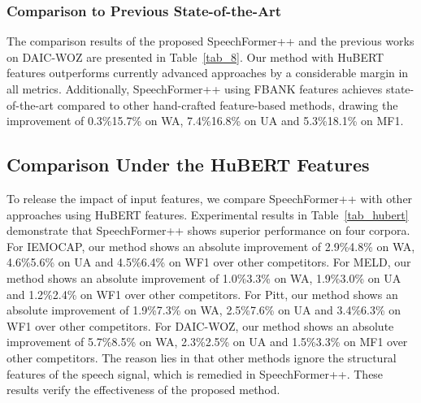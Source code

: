 \documentclass[lettersize,journal]{IEEEtran}
\begin{document}
\subsubsection{Comparison to Previous State-of-the-Art} The comparison results of the proposed SpeechFormer++ and the previous works on DAIC-WOZ are presented in Table~\ref{tab_8}. Our method with HuBERT features outperforms currently advanced approaches by a considerable margin in all metrics. Additionally, SpeechFormer++ using FBANK features achieves state-of-the-art compared to other hand-crafted feature-based methods, drawing the improvement of 0.3\%15.7\% on WA, 7.4\%16.8\% on UA and 5.3\%18.1\% on MF1.

\subsection{Comparison Under the HuBERT Features}
To release the impact of input features, we compare SpeechFormer++ with other approaches using HuBERT features. Experimental results in Table~\ref{tab_hubert} demonstrate that SpeechFormer++ shows superior performance on four corpora. For IEMOCAP, our method shows an absolute improvement of 2.9\%4.8\% on WA, 4.6\%5.6\% on UA and 4.5\%6.4\% on WF1 over other competitors. For MELD, our method shows an absolute improvement of 1.0\%3.3\% on WA, 1.9\%3.0\% on UA and 1.2\%2.4\% on WF1 over other competitors. For Pitt, our method shows an absolute improvement of 1.9\%7.3\% on WA, 2.5\%7.6\% on UA and 3.4\%6.3\% on WF1 over other competitors. For DAIC-WOZ, our method shows an absolute improvement of 5.7\%8.5\% on WA, 2.3\%2.5\% on UA and 1.5\%3.3\% on MF1 over other competitors. The reason lies in that other methods ignore the structural features of the speech signal, which is remedied in SpeechFormer++. These results verify the effectiveness of the proposed method.
\end{document}
